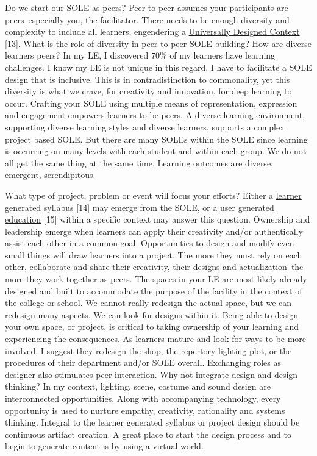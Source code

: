 Do we start our SOLE as peers? Peer to peer assumes your participants
are peers--especially you, the facilitator. There needs to be enough
diversity and complexity to include all learners, engendering a
\href{http://www.cast.org/library/UDLguidelines/}{Universally Designed
Context} {[}13{]}. What is the role of diversity in peer to peer SOLE
building? How are diverse learners peers? In my LE, I discovered 70\% of
my learners have learning challenges. I know my LE is not unique in this
regard. I have to facilitate a SOLE design that is inclusive. This is in
contradistinction to commonality, yet this diversity is what we crave,
for creativity and innovation, for deep learning to occur. Crafting your
SOLE using multiple means of representation, expression and engagement
empowers learners to be peers. A diverse learning environment,
supporting diverse learning styles and diverse learners, supports a
complex project based SOLE. But there are many SOLEs within the SOLE
since learning is occurring on many levels with each student and within
each group. We do not all get the same thing at the same time. Learning
outcomes are diverse, emergent, serendipitous.

What type of project, problem or event will focus your efforts? Either a
\href{http://www.theatreprof.com/2011/active-learning-student-generated-syllabus/}{learner
generated syllabus {[}}14{]} may emerge from the SOLE, or a
\href{http://usergeneratededucation.wordpress.com/}{user generated
education} {[}15{]} within a specific context may answer this question.
Ownership and leadership emerge when learners can apply their creativity
and/or authentically assist each other in a common goal. Opportunities
to design and modify even small things will draw learners into a
project. The more they must rely on each other, collaborate and share
their creativity, their designs and actualization--the more they work
together as peers. The spaces in your LE are most likely already
designed and built to accommodate the purpose of the facility in the
context of the college or school. We cannot really redesign the actual
space, but we can redesign many aspects. We can look for designs within
it. Being able to design your own space, or project, is critical to
taking ownership of your learning and experiencing the consequences. As
learners mature and look for ways to be more involved, I suggest they
redesign the shop, the repertory lighting plot, or the procedures of
their department and/or SOLE overall. Exchanging roles as designer also
stimulates peer interaction. Why not integrate design and design
thinking? In my context, lighting, scene, costume and sound design are
interconnected opportunities. Along with accompanying technology, every
opportunity is used to nurture empathy, creativity, rationality and
systems thinking. Integral to the learner generated syllabus or project
design should be continuous artifact creation. A great place to start
the design process and to begin to generate content is by using a
virtual world.

